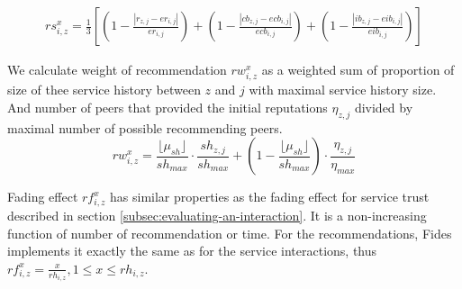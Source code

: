\begin{equation}
\begin{split}
    rs^{x}_{i,z} = \frac{1}{3} \left[ \left(1-\frac{\left|r_{z, j} - er_{i,j}\right|}{er_{i,j}}\right) + \left(1 - \frac{\left|cb_{z, j} - ecb_{i, j}\right|}{ecb_{i, j}}\right) + \left(1 - \frac{\left|ib_{z, j} - eib_{i, j}\right|}{eib_{i, j}}\right) \right]
\end{split}
\end{equation}

We calculate weight of recommendation $rw^{x}_{i,z}$ as a weighted sum of proportion of size of thee service history between $z$ and $j$ with maximal service history size. And number of peers that provided the initial reputations $\eta_{z,j}$ divided by maximal number of possible recommending peers.
\begin{equation}
    rw^{x}_{i,z} = \frac{\lfloor\mu_{sh}\rfloor}{sh_{max}} \cdot \frac{sh_{z, j}}{sh_{max}} + \left(1 - \frac{\lfloor\mu_{sh}\rfloor}{sh_{max}}\right) \cdot \frac{\eta_{z,j}}{\eta_{max}}
\end{equation}

Fading effect $rf^{x}_{i, z}$ has similar properties as the fading effect for service trust described in section \ref{subsec:evaluating-an-interaction}. It is a non-increasing function of number of recommendation or time. 
For the recommendations, Fides implements it exactly the same as for the service interactions, thus $rf^{x}_{i, z} = \frac{x}{rh_{i, z}}, 1 \leq x \leq rh_{i,z}$.
